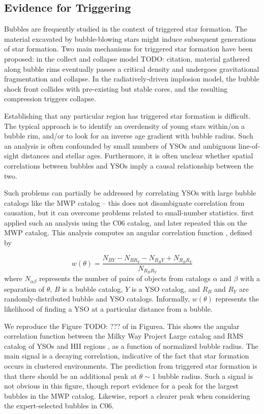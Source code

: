 \documentclass[preprint]{aastex}
\newcommand{\todo}[1]{{\color[rgb]{0, .5, .5} TODO: #1}}
\begin{document}
\subsection{Evidence for Triggering}

Bubbles are frequently studied in the context of triggered star formation. The material excavated by bubble-blowing stars might induce subsequent generations of star formation. Two main mechanisms for triggered star formation have been proposed: in the collect and collapse model \todo{citation}, material gathered along bubble rims eventually passes a critical density and undergoes gravitational fragmentation and collapse. In the radiatively-driven implosion model, the bubble shock front collides with pre-existing but stable cores, and the resulting compression triggers collapse.

Establishing that any particular region has triggered star formation is difficult. The typical approach is to identify an overdensity of young stars within/on a bubble rim, and/or to look for an inverse age gradient with bubble radius. Such an analysis is often confounded by small numbers of YSOs and ambiguous line-of-sight distances and stellar ages. Furthermore, it is often unclear whether spatial correlations between bubbles and YSOs imply a causal relationship between the two.

Such problems can partially be addressed by correlating YSOs with large bubble catalogs like the MWP catalog -- this does not disambiguate correlation from causation, but it can overcome problems related to small-number statistics. \cite{Thompson12} first applied such an analysis using the C06 catalog, and \cite{Kendrew12} later repeated this on the MWP catalog. This analysis computes an angular correlation function \citep{Landy93, Bradshaw11}, defined by

\begin{equation}
w(\theta) = \frac{N_{BY} - N_{BR_Y} - N_{R_BY} + N_{R_BR_Y}}{N_{R_BR_Y}}
\end{equation}
where $N_{\alpha \beta}$ represents the number of pairs of objects from catalogs $\alpha$ and $\beta$ with a separation of $\theta$, $B$ is a bubble catalog, $Y$ is a YSO catalog, and $R_B$ and $R_Y$ are randomly-distributed bubble and YSO catalogs. Informally, $w(\theta)$ represents the likelihood of finding a YSO at a particular distance from a bubble. 

We reproduce the Figure \todo{???} of \cite{Kendrew12} in Figure\citep{fig:trigger}a. This shows the angular correlation function between the Milky Way Project Large catalog and RMS catalog of YSOs and HII regions \citep{RMS}, as a function of normalized bubble radius. The main signal is a decaying correlation, indicative of the fact that star formation occurs in clustered environments. The prediction from triggered star formation is that there should be an additional peak at $\theta \sim 1$ bubble radius. Such a signal is not obvious in this figure, though \citep{Kendrew} report evidence for a peak for the largest bubbles in the MWP catalog. Likewise, \cite{Thompson12} report a clearer peak when considering the expert-selected bubbles in C06. 
\end{document}
